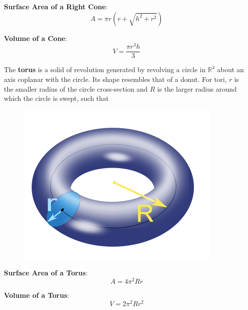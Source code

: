         \noindent \color{purple} \textbf{Surface Area of a Right Cone}: \color{black} \\

        \begin{equation*}
            A=\pi r(r+\sqrt{h^2+r^2})
        \end{equation*}

        \noindent \color{purple} \textbf{Volume of a Cone}: \color{black} \\

        \begin{equation*}
            V = \frac{\pi r^3h}{3}
        \end{equation*}

        \noindent The \textbf{torus} is a solid of revolution generated by revolving a
        circle in $\mathbb{R}^3$ about an axis coplanar with the circle. Its shape resembles
        that of a donut. For tori, $r$ is the smaller radius of the circle cross-section and
        $R$ is the larger radius around which the circle is swept, such that \\

        \begin{figure} [hbt!]
            \centering
            \includegraphics[scale=0.5]{Resources/Unit6Solids/torus.png}
        \end{figure}

        \noindent \color{purple} \textbf{Surface Area of a Torus}: \color{black} \\

        \begin{equation*}
            A = 4 {\pi}^2 Rr
        \end{equation*}

        \noindent \color{purple} \textbf{Volume of a Torus}: \color{black} \\

        \begin{equation*}
            V = 2 {\pi}^2 Rr^2
        \end{equation*}